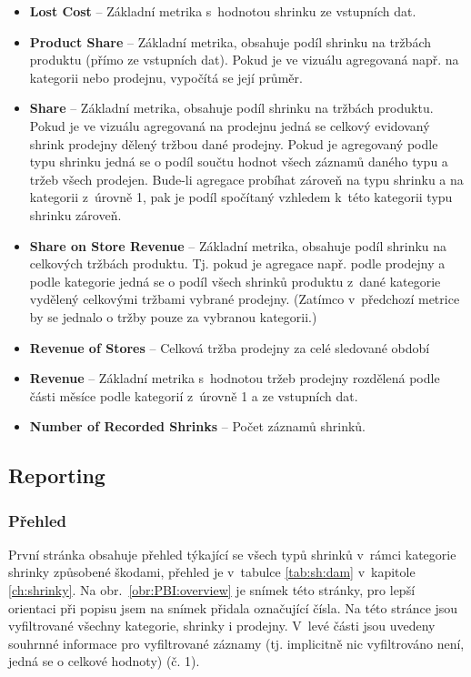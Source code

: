 \begin{itemize}
    \itemsep-0.3em
    \item     \textbf{Lost Cost} -- Základní metrika s~hodnotou shrinku ze vstupních dat.
    \item     \textbf{Product Share} -- Základní metrika, obsahuje podíl shrinku na tržbách produktu (přímo ze vstupních dat). Pokud je ve vizuálu agregovaná např. na kategorii nebo prodejnu, vypočítá se její průměr.
    \item     \textbf{Share} -- Základní metrika, obsahuje podíl shrinku na tržbách produktu. Pokud je ve vizuálu agregovaná na prodejnu jedná se celkový evidovaný shrink prodejny dělený tržbou dané prodejny. Pokud je agregovaný podle typu shrinku jedná se o podíl součtu hodnot všech záznamů daného typu a tržeb všech prodejen. Bude-li agregace probíhat zároveň na typu shrinku a na kategorii z~úrovně 1, pak je podíl spočítaný vzhledem k~této kategorii typu shrinku zároveň. 
    \item     \textbf{Share on Store Revenue} -- Základní metrika, obsahuje podíl shrinku na celkových tržbách produktu. Tj. pokud je agregace např. podle prodejny a podle kategorie jedná se o podíl všech shrinků produktu z~dané kategorie vydělený celkovými tržbami vybrané prodejny. (Zatímco v~předchozí metrice by se jednalo o tržby pouze za vybranou kategorii.)
    \item     \textbf{Revenue of Stores} -- Celková tržba prodejny za celé sledované období
    \item     \textbf{Revenue} -- Základní metrika s~hodnotou tržeb prodejny rozdělená podle části měsíce podle kategorií z~úrovně 1 a  ze vstupních dat.
    \item     \textbf{Number of Recorded Shrinks} -- Počet záznamů shrinků.
\end{itemize}

\subsection{Reporting}

\subsubsection*{Přehled}

První stránka obsahuje přehled týkající se všech typů shrinků v~rámci kategorie shrinky způsobené škodami, přehled je v~tabulce \ref*{tab:sh:dam} v~kapitole \ref*{ch:shrinky}. Na obr.~\ref*{obr:PBI:overview} je snímek této stránky, pro lepší orientaci při popisu jsem na snímek přidala označující čísla. Na této stránce jsou vyfiltrované všechny kategorie, shrinky i prodejny. V~levé části jsou uvedeny souhrnné informace pro vyfiltrované záznamy (tj. implicitně nic vyfiltrováno není, jedná se o celkové hodnoty) (č. 1). 

